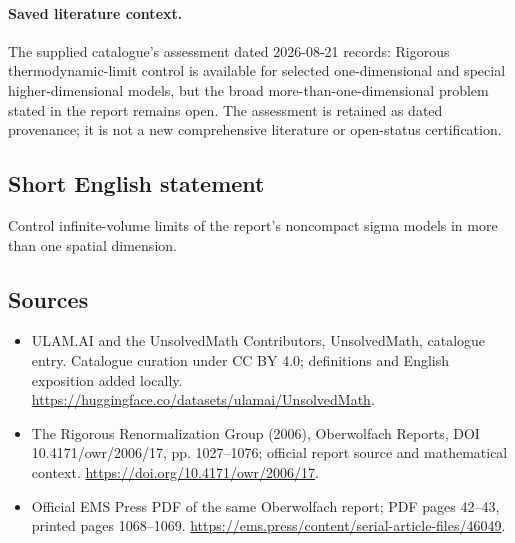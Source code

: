 \documentclass[11pt]{article}
\begin{document}
\paragraph{Saved literature context.} The supplied catalogue's assessment dated 2026-08-21 records: Rigorous thermodynamic-limit control is available for selected one-dimensional and special higher-dimensional models, but the broad more-than-one-dimensional problem stated in the report remains open. The assessment is retained as dated provenance; it is not a new comprehensive literature or open-status certification.
\subsection{Short English statement}
Control infinite-volume limits of the report's noncompact sigma models in more than one spatial dimension.
\subsection{Sources}
\begin{itemize}
\item[\hypertarget{source:statement:1}{S1}] ULAM.AI and the UnsolvedMath Contributors, UnsolvedMath, catalogue entry. Catalogue curation under CC BY 4.0; definitions and English exposition added locally.
\url{https://huggingface.co/datasets/ulamai/UnsolvedMath}.
\item[\hypertarget{source:statement:2}{S2}] The Rigorous Renormalization Group (2006), Oberwolfach Reports, DOI 10.4171/owr/2006/17, pp. 1027--1076; official report source and mathematical context.
\url{https://doi.org/10.4171/owr/2006/17}.
\item[\hypertarget{source:statement:3}{S3}] Official EMS Press PDF of the same Oberwolfach report; PDF pages 42--43, printed pages 1068--1069.
\url{https://ems.press/content/serial-article-files/46049}.
\end{itemize}
\label{end:statement}
\end{document}
